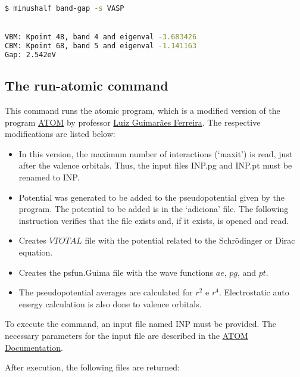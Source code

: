 \begin{lstlisting}[language=bash,caption={Example of the band-gap for SiC-2D}]
$ minushalf band-gap -s VASP


VBM: Kpoint 48, band 4 and eigenval -3.683426
CBM: Kpoint 68, band 5 and eigenval -1.141163
Gap: 2.542eV
\end{lstlisting}

\subsection{The run-atomic command}
\label{atomic}
This command runs the atomic program, which is a modified version of the program \href{https://siesta.icmab.es/SIESTA_MATERIAL/Pseudos/atom_licence.html}{ATOM} by professor \href{http://lattes.cnpq.br/4694847711359239}{Luiz Guimarães Ferreira}. The respective modifications are listed below:

\begin{itemize}
	\item In this version, the maximum number of interactions (‘maxit’) is read, just after the valence       orbitals. Thus, the input files INP.pg and INP.pt must be renamed to INP.
	\item Potential was generated to be added to the pseudopotential given by the program. The potential to be added is in the ‘adiciona’ file. The following instruction verifies that the       file exists and, if it exists, is opened and read.
	\item Creates $VTOTAL$ file with the potential related to the Schrödinger or Dirac equation.
	\item Creates the psfun.Guima file with the wave functions $ae$, $pg$, and  $pt$.
	\item The pseudopotential averages are calculated for $r^{2}$ e $r^{4}$. Electrostatic auto energy calculation is also done to valence orbitals.
\end{itemize}

To execute the command, an input file named INP must be provided. The necessary parameters for the input file are described in the \href{https://siesta.icmab.es/SIESTA_MATERIAL/Pseudos/atom_licence.html}{ATOM Documentation}. 

\medskip

After execution, the following files are returned:

